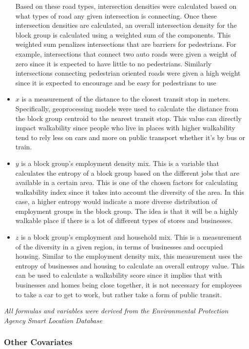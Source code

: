 \documentclass[
]{article}
\begin{document}
\begin{itemize}
  Based on these road types, intersection densities were calculated
  based on what types of road any given intersection is connecting. Once
  these intersection densities are calculated, an overall intersection
  density for the block group is calculated using a weighted sum of the
  components. This weighted sum penalizes intersections that are
  barriers for pedestrians. For example, intersections that connect two
  auto roads were given a weight of zero since it is expected to have
  little to no pedestrians. Similarly intersections connecting
  pedestrian oriented roads were given a high weight since it is
  expected to encourage and be easy for pedestrians to use
\item
  \(x\) is a measurement of the distance to the closest transit stop in
  meters. Specifically, geoprocessing models were used to calculate the
  distance from the block group centroid to the nearest transit stop.
  This value can directly impact walkability since people who live in
  places with higher walkability tend to rely less on cars and more on
  public transport whether it's by bus or train.
\item
  \(y\) is a block group's employment density mix. This is a variable
  that calculates the entropy of a block group based on the different
  jobs that are available in a certain area. This is one of the chosen
  factors for calculating walkability index since it takes into account
  the diversity of the area. In this case, a higher entropy would
  indicate a more diverse distribution of employment groups in the block
  group. The idea is that it will be a highly walkable place if there is
  a lot of different types of stores and businesses.
\item
  \(z\) is a block group's employment and household mix. This is a
  measurement of the diversity in a given region, in terms of businesses
  and occupied housing. Similar to the employment density mix, this
  measurement uses the entropy of businesses and housing to calculate an
  overall entropy value. This can be used to calculate a walkability
  score since it implies that with businesses and homes being close
  together, it is not necessary for employees to take a car to get to
  work, but rather take a form of public transit.
\end{itemize}

\emph{All formulas and variables were derived from the Environmental
Protection Agency Smart Location Database}

\subsubsection{Other Covariates}\label{other-covariates}
\end{document}
